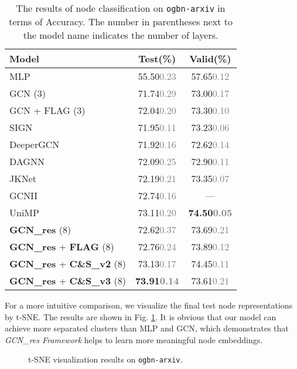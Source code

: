 \documentclass[runningheads]{llncs}
\newcommand{\std}[1]{\textcolor{gray}{\scriptsize{#1}}}
\begin{document}
\begin{table}[htbp] 
\caption{The results of node classification on \texttt{ogbn-arxiv} in terms of Accuracy. The number in parentheses next to
the model name indicates the number of layers.}
\label{table:ogbn-arxiv-baseline}
\begin{center}
\renewcommand\tabcolsep{7.0pt}
\begin{tabular}{l|c|c}
\hline
\textbf{Model}  & \textbf{Test(\%)} & \textbf{Valid(\%)}  \\
\hline
\hline
MLP  & 55.50\std{0.23} & 57.65\std{0.12} \\
GCN (3) \cite{kipf2016semi} & 71.74\std{0.29} & 73.00\std{0.17} \\
GCN + FLAG (3) & 72.04\std{0.20} & 73.30\std{0.10} \\
SIGN \cite{rossi2020sign} & 71.95\std{0.11} & 73.23\std{0.06} \\
DeeperGCN \cite{li2020deepergcn} & 71.92\std{0.16} & 72.62\std{0.14} \\
DAGNN \cite{liu2020towards} & 72.09\std{0.25} & 72.90\std{0.11} \\
JKNet \cite{xu2018representation} & 72.19\std{0.21} & 73.35\std{0.07} \\
GCNII \cite{chen2020simple}& 72.74\std{0.16} & --- \\
UniMP \cite{shi2020masked}& 73.11\std{0.20} & \textbf{74.50\std{0.05}} \\
\hline
\hline
\textbf{GCN\_res} (8) & 72.62\std{0.37} & 73.69\std{0.21} \\
\textbf{GCN\_res} + \textbf{FLAG} (8) & 72.76\std{0.24} & 73.89\std{0.12} \\
\textbf{GCN\_res} + \textbf{C\&S\_v2} (8) & 73.13\std{0.17} & 74.45\std{0.11} \\
\textbf{GCN\_res} + \textbf{C\&S\_v3} (8) & \textbf{73.91\std{0.14}} &
73.61\std{0.21} \\
\hline
\end{tabular}
\end{center} 
\end{table}


For a more intuitive comparison, we visualize the final test node representations by t-SNE. The results are shown in Fig. \ref{fig:tSNE}. It is obvious that our model can achieve more separated clusters than MLP and GCN, which demonstrates that \textsl{GCN\_res Framework} helps to learn more meaningful node embeddings.


\begin{figure}[htbp]
\centering
{}
\quad
{}
\quad
{}
\quad
{}
\caption{t-SNE visualization results on \texttt{ogbn-arxiv}.}
\label{fig:tSNE}
\end{figure}
\end{document}
